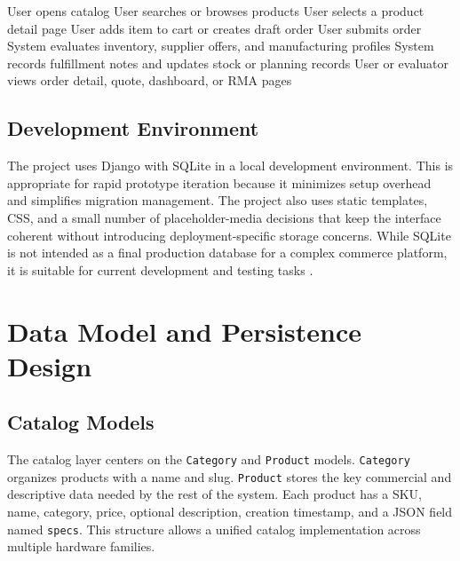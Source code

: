 \documentclass[12pt,letterpaper,oneside,openany]{book}
\begin{document}
\begin{algorithm}[H]
\caption{Simplified user-facing workflow}
\begin{algorithmic}[1]
\State User opens catalog
\State User searches or browses products
\State User selects a product detail page
\State User adds item to cart or creates draft order
\State User submits order
\State System evaluates inventory, supplier offers, and manufacturing profiles
\State System records fulfillment notes and updates stock or planning records
\State User or evaluator views order detail, quote, dashboard, or RMA pages
\end{algorithmic}
\label{alg:userflow}
\end{algorithm}

\section{Development Environment}

\begin{justifying}
The project uses Django with SQLite in a local development environment. This is
appropriate for rapid prototype iteration because it minimizes setup overhead
and simplifies migration management. The project also uses static templates,
CSS, and a small number of placeholder-media decisions that keep the interface
coherent without introducing deployment-specific storage concerns. While SQLite
is not intended as a final production database for a complex commerce platform,
it is suitable for current development and testing tasks \cite{sqlite-docs}.
\end{justifying}

\chapter{Data Model and Persistence Design}

\section{Catalog Models}

\begin{justifying}
The catalog layer centers on the \texttt{Category} and \texttt{Product} models.
\texttt{Category} organizes products with a name and slug. \texttt{Product}
stores the key commercial and descriptive data needed by the rest of the
system. Each product has a SKU, name, category, price, optional description,
creation timestamp, and a JSON field named \texttt{specs}. This structure
allows a unified catalog implementation across multiple hardware families.
\end{justifying}
\end{document}
